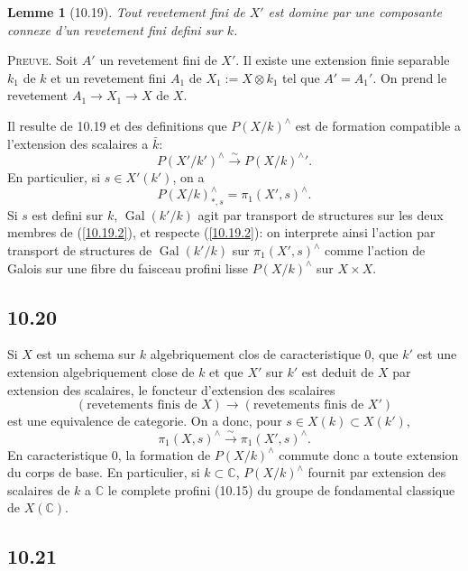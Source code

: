 \documentclass[12pt,a4paper]{article}
\theoremstyle{plain}
\newtheorem{lemma}[theorem]{Lemme}
\theoremstyle{definition}
\theoremstyle{remark}
\DeclareMathOperator{\Gal}{Gal}
\newcommand{\C}{\mathbb{C}}
\begin{document}
\begin{lemma}[10.19]
Tout revetement fini de $X'$ est domine par une composante connexe d'un revetement fini defini sur $k$.
\end{lemma}

\textsc{Preuve.} Soit $A'$ un revetement fini de $X'$. Il existe une extension finie separable $k_1$ de $k$ et un revetement fini $A_1$ de $X_1 := X \otimes k_1$ tel que $A' = A_1'$. On prend le revetement $A_1 \to X_1 \to X$ de $X$.

Il resulte de 10.19 et des definitions que $P(X/k)^\wedge$ est de formation compatible a l'extension des scalaires a $\bar{k}$:
\begin{equation}\label{10.19.1}
P(X'/k')^\wedge \xrightarrow{\sim} {P(X/k)^\wedge}'. \tag{10.19.1}
\end{equation}
En particulier, si $s \in X'(k')$, on a
\begin{equation}\label{10.19.2}
P(X/k)^\wedge_{*, s} = \pi_1(X', s)^\wedge. \tag{10.19.2}
\end{equation}
Si $s$ est defini sur $k$, $\Gal(k'/k)$ agit par transport de structures sur les deux membres de (\ref{10.19.2}), et respecte (\ref{10.19.2}): on interprete ainsi l'action par transport de structures de $\Gal(k'/k)$ sur $\pi_1(X', s)^\wedge$ comme l'action de Galois sur une fibre du faisceau profini lisse $P(X/k)^\wedge$ sur $X \times X$.

\subsection*{10.20}

Si $X$ est un schema sur $k$ algebriquement clos de caracteristique 0, que $k'$ est une extension algebriquement close de $k$ et que $X'$ sur $k'$ est deduit de $X$ par extension des scalaires, le foncteur d'extension des scalaires
$$(\text{revetements finis de } X) \longrightarrow (\text{revetements finis de } X')$$
est une equivalence de categorie. On a donc, pour $s \in X(k) \subset X(k')$,
$$\pi_1(X, s)^\wedge \xrightarrow{\sim} \pi_1(X', s)^\wedge.$$
En caracteristique 0, la formation de $P(X/k)^\wedge$ commute donc a toute extension du corps de base. En particulier, si $k \subset \C$, $P(X/k)^\wedge$ fournit par extension des scalaires de $k$ a $\C$ le complete profini (10.15) du groupe de fondamental classique de $X(\C)$.

\subsection*{10.21}
\end{document}
